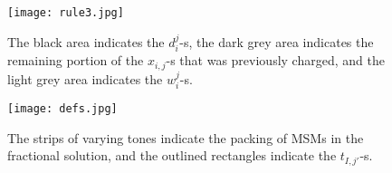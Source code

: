 \documentclass[11pt]{article}
\begin{document}
\begin{figure}[ht]
\center
\texttt{[image: rule3.jpg]}
\caption{The black area indicates the $d_i^j$-s, the dark grey area indicates
the remaining portion of the $x_{i,j}$-s that was previously charged, and
the light grey area indicates the $w_i^j$-s.}
\label{fig.rule3}
\end{figure}

\bigskip\bigskip\bigskip

\begin{figure}[ht]
\center
\texttt{[image: defs.jpg]}
\caption{The strips of varying tones indicate the packing of MSMs
in the fractional solution, and the outlined rectangles indicate the
$t_{I,j'}$-s.}
\label{fig.defs}
\end{figure}
\end{document}
